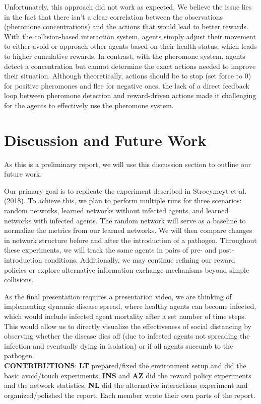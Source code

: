 \documentclass[9pt]{IEEEtran}
\begin{document}
Unfortunately, this approach did not work as expected. We believe the issue lies in the fact that there isn't a clear correlation between the observations (pheromone concentrations) and the actions that would lead to better rewards. With the collision-based interaction system, agents simply adjust their movement to either avoid or approach other agents based on their health status, which leads to higher cumulative rewards. In contrast, with the pheromone system, agents detect a concentration but cannot determine the exact actions needed to improve their situation. Although theoretically, actions should be to stop (set force to 0) for positive pheromones and flee for negative ones, the lack of a direct feedback loop between pheromone detection and reward-driven actions made it challenging for the agents to effectively use the pheromone system.

\newpage
\section{Discussion and Future Work}

As this is a preliminary report, we will use this discussion section to outline our future work.

Our primary goal is to replicate the experiment described in Stroeymeyt et al. (2018)\cite{Stroeymeyt2018}. To achieve this, we plan to perform multiple runs for three scenarios: random networks, learned networks without infected agents, and learned networks with infected agents. The random network will serve as a baseline to normalize the metrics from our learned networks. We will then compare changes in network structure before and after the introduction of a pathogen. Throughout these experiments, we will track the same agents in pairs of pre- and post-introduction conditions. Additionally, we may continue refining our reward policies or explore alternative information exchange mechanisms beyond simple collisions.

As the final presentation requires a presentation video, we are thinking of implementing dynamic disease spread, where healthy agents can become infected, which would include infected agent mortality after a set number of time steps. This would allow us to directly visualize the effectiveness of social distancing by observing whether the disease dies off (due to infected agents not spreading the infection and eventually dying in isolation) or if all agents succumb to the pathogen.\\

\noindent\textbf{CONTRIBUTIONS}: \textbf{LT} prepared/fixed the environment setup and did the basic avoid/touch experiments, \textbf{INS} and \textbf{AZ} did the reward policy experiments and the network statistics, \textbf{NL} did the alternative interactions experiment and organized/polished the report. Each member wrote their own parts of the report.

\printbibliography
\end{document}
